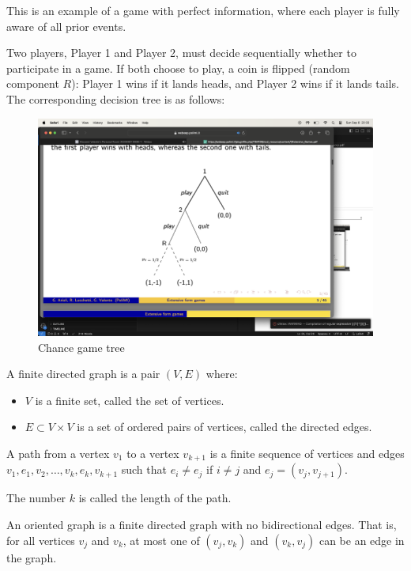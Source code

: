 This is an example of a game with perfect information, where each player is fully aware of all prior events.
\begin{example}
    Two players, Player 1 and Player 2, must decide sequentially whether to participate in a game.
    If both choose to play, a coin is flipped (random component $R$): Player 1 wins if it lands heads, and Player 2 wins if it lands tails.
    The corresponding decision tree is as follows:
    \begin{figure}[H]
        \centering
        \includegraphics[width=0.75\linewidth]{images/tree1.png}
        \caption{Chance game tree}
    \end{figure}
\end{example}
\begin{definition}
    A finite directed graph is a pair $(V,E)$ where:
\end{definition}
\begin{itemize}
    \item $V$ is a finite set, called the set of vertices. 
    \item $E \subset V \times V$ is a set of ordered pairs of vertices, called the directed edges.
\end{itemize}
\begin{definition}
    A path from a vertex $v_1$ to a vertex $v_{k+1}$ is a finite sequence of vertices and edges $v_1,e_1,v_2,\dots,v_k,e_k,v_{k+1}$ such that $e_i \neq e_j$ if $i \neq j$ and $e_j = (v_j,v_{j+1})$. 
\end{definition}
The number $k$ is called the length of the path.
\begin{definition}
    An oriented graph is a finite directed graph with no bidirectional edges. 
    That is, for all vertices $v_j$ and $v_k$, at most one of $(v_j,v_k)$ and $(v_k,v_j)$ can be an edge in the graph.
\end{definition}
